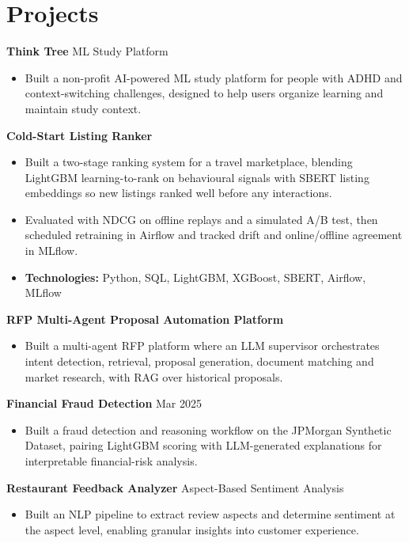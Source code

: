 \documentclass[10pt,a4paper]{article}
\begin{document}
\section{Projects}
\textbf{Think Tree} \textbar{} ML Study Platform\par
\begin{itemize}
  \item Built a non-profit AI-powered ML study platform for people with ADHD and context-switching challenges, designed to help users organize learning and maintain study context.
\end{itemize}
\textbf{Cold-Start Listing Ranker}\par
\begin{itemize}
  \item Built a two-stage ranking system for a travel marketplace, blending LightGBM learning-to-rank on behavioural signals with SBERT listing embeddings so new listings ranked well before any interactions.
  \item Evaluated with NDCG on offline replays and a simulated A/B test, then scheduled retraining in Airflow and tracked drift and online/offline agreement in MLflow.
  \item \textbf{Technologies:} Python, SQL, LightGBM, XGBoost, SBERT, Airflow, MLflow
\end{itemize}
\textbf{RFP Multi-Agent Proposal Automation Platform}\par
\begin{itemize}
  \item Built a multi-agent RFP platform where an LLM supervisor orchestrates intent detection, retrieval, proposal generation, document matching and market research, with RAG over historical proposals.
\end{itemize}
\textbf{Financial Fraud Detection} \textbar{} Mar 2025\par
\begin{itemize}
  \item Built a fraud detection and reasoning workflow on the JPMorgan Synthetic Dataset, pairing LightGBM scoring with LLM-generated explanations for interpretable financial-risk analysis.
\end{itemize}
\textbf{Restaurant Feedback Analyzer} \textbar{} Aspect-Based Sentiment Analysis\par
\begin{itemize}
  \item Built an NLP pipeline to extract review aspects and determine sentiment at the aspect level, enabling granular insights into customer experience.
\end{itemize}
\end{document}
